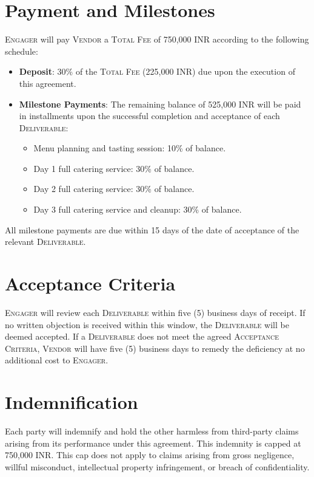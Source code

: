 \documentclass[11pt,letterpaper]{article}
\begin{document}
\section{Payment and Milestones}
\textsc{Engager} will pay \textsc{Vendor} a \textsc{Total Fee} of 750,000 INR according to the following schedule:
\begin{itemize}[leftmargin=1.2em]
\item \textbf{Deposit}: 30\% of the \textsc{Total Fee} (225,000 INR) due upon the execution of this agreement.
\item \textbf{Milestone Payments}: The remaining balance of 525,000 INR will be paid in installments upon the successful completion and acceptance of each \textsc{Deliverable}:
\begin{itemize}
\item Menu planning and tasting session: 10\% of balance.
\item Day 1 full catering service: 30\% of balance.
\item Day 2 full catering service: 30\% of balance.
\item Day 3 full catering service and cleanup: 30\% of balance.
\end{itemize}
\end{itemize}
All milestone payments are due within 15 days of the date of acceptance of the relevant \textsc{Deliverable}.

\section{Acceptance Criteria}
\textsc{Engager} will review each \textsc{Deliverable} within five (5) business days of receipt. If no written objection is received within this window, the \textsc{Deliverable} will be deemed accepted. If a \textsc{Deliverable} does not meet the agreed \textsc{Acceptance Criteria}, \textsc{Vendor} will have five (5) business days to remedy the deficiency at no additional cost to \textsc{Engager}.

\section{Indemnification}
Each party will indemnify and hold the other harmless from third-party claims arising from its performance under this agreement. This indemnity is capped at 750,000 INR. This cap does not apply to claims arising from gross negligence, willful misconduct, intellectual property infringement, or breach of confidentiality.
\end{document}
